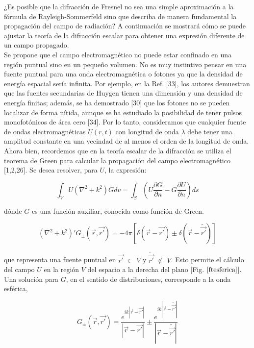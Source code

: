     ¿Es posible que la difracción de Fresnel no sea una simple aproximación a la fórmula de Rayleigh-Sommerfeld sino que describa de manera fundamental la propagación del campo de radiación? A continuación se mostrará cómo se puede ajustar la teoría de la difracción escalar para obtener una expresión diferente de un campo propagado. \\
    Se propone que el campo electromagnético no puede estar confinado en una región puntual sino en un pequeño volumen. No es muy instintivo pensar en una fuente puntual para una onda electromagnética o fotones ya que la densidad de energía espacial sería infinita. Por ejemplo, en la Ref. [33], los autores demuestran que las fuentes secundarias de Huygen tienen una dimensión y una densidad de energía finitas; además, se ha demostrado [30] que los fotones no se pueden localizar de forma nítida, aunque se ha estudiado la posibilidad de tener pulsos monofotónicos de área cero [34]. Por lo tanto, consideramos que cualquier fuente de ondas electromagnéticas $U(r,t)$ con longitud de onda $\lambda$ debe tener una amplitud constante en una vecindad de al menos el orden de la longitud de onda. Ahora bien, recordemos que en la teoría escalar de la difracción se utiliza el teorema de Green para calcular la propagación del campo electromagnético [1,2,26]. Se desea resolver, para $U$, la expresión:
    
    \begin{equation}
        \int_{V} U(\nabla ^{2} + k^{2}) G dv = \int_{S} \left ( U \frac{\partial G}{\partial n} - G \frac{\partial U}{\partial n} \right ) ds
        \label{intgreen}
    \end{equation}
    
    dónde $G$ es una función auxiliar, conocida como función de Green.
    
    \begin{equation}
        (\nabla^{2} + k^{2})'G_{\pm}(\vec{r}, \vec{r'}) = -4\pi [\delta(\vec{r} - \vec{r'}) \pm \delta(\vec{r} - \widetilde{\vec{r'}})]
        \label{condgreen}
    \end{equation}
    
    que representa una fuente puntual en $\vec{r'}$ $\in$ $V$ y $\widetilde{\vec{r'}}$ $\notin$ $V$. Esto permite el cálculo del campo $U$ en la región $V$ del espacio a la derecha del plano [Fig. $\ref{ftesferica}$]. Una solución para $G$, en el sentido de distribuciones, corresponde a la onda esférica,
    
    \begin{equation}
        G_{\pm} (\vec{r}, \vec{r'}) = \frac{e^{ik\left | \vec{r} - \vec{r'} \right |}}{\left | \vec{r} - \vec{r'} \right |} \pm \frac{e^{ik\left | \vec{r} - \widetilde{\vec{r'}} \right |}}{\left | \vec{r} - \widetilde{\vec{r'}} \right |}
    \end{equation}
    
